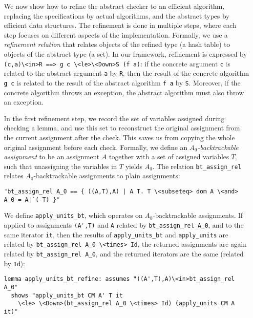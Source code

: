 \documentclass{llncs}
\newcommand{\isai}{\lstinline[language=isabelle,basicstyle=\normalsize\ttfamily\slshape]}
\begin{document}
We now show how to refine the abstract checker to an efficient algorithm, replacing the specifications by actual algorithms,
and the abstract types by efficient data structures.
The refinement is done in multiple steps, where each step focuses on different aspects of the implementation. 
Formally, we use a \emph{refinement relation} that relates objects of the refined type (\eg a hash table) to 
objects of the abstract type (\eg a set). In our framework, refinement is expressed 
by \isai{(c,a)\<in>R ==> g c \<le>\<Down>S (f a)}: if the concrete argument \isai$c$ is related to the abstract argument \isai$a$ by \isai$R$, then the result of the concrete
algorithm \isai$g c$ is related to the result of the abstract algorithm \isai$f a$ by \isai$S$. Moreover, if the concrete algorithm throws an exception, 
the abstract algorithm must also throw an exception.

In the first refinement step, we record the set of variables assigned during checking a lemma, 
and use this set to reconstruct the original assignment from the current assignment after the check. 
This saves us from copying the whole original assignment before each check.
Formally, we define an \emph{$A_0$-backtrackable assignment} to be an assignment $A$ together with a set of assigned variables $T$, such that
unassigning the variables in $T$ yields $A_0$. The relation \isai{bt_assign_rel} relates $A_0$-backtrackable assignments to plain assignments:
\begin{lstlisting}
"bt_assign_rel A_0 == { ((A,T),A) | A T. T \<subseteq> dom A \<and> A_0 = A|`(-T) }"
\end{lstlisting}
We define \isai{apply_units_bt}, which operates on $A_0$-backtrackable assignments. If applied 
to assignments \isai$(A',T)$ and \isai$A$ related by \isai{bt_assign_rel A_0}, and to the same iterator \isai$it$, then the results of 
\isai{apply_units_bt} and \isai{apply_units} are related by \isai{bt_assign_rel A_0 \<times> Id}, \ie the returned assignments 
are again related by \isai{bt_assign_rel A_0}, and the returned iterators are the same (related by \isai{Id}):
\begin{lstlisting}
lemma apply_units_bt_refine: assumes "((A',T),A)\<in>bt_assign_rel A_0"
  shows "apply_units_bt CM A' T it 
    \<le> \<Down>(bt_assign_rel A_0 \<times> Id) (apply_units CM A it)"
\end{lstlisting}
\end{document}
